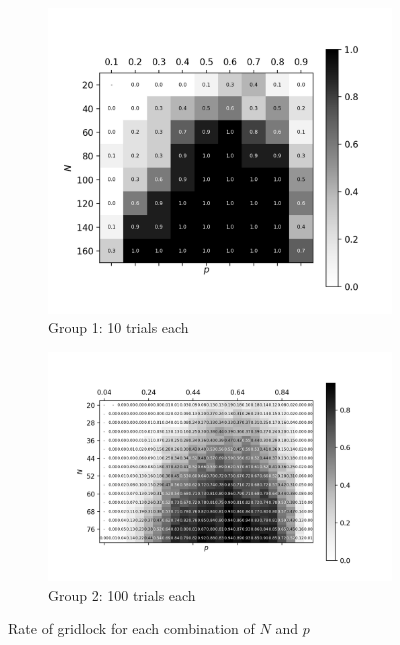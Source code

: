 \begin{figure}
\centering
\begin{subfigure}[c]{0.48\textwidth}
\centering
\includegraphics[height=0.225\textheight]{fig/gridlock_big}
\caption{Group 1: 10 trials each}
\end{subfigure}
\quad
\begin{subfigure}[c]{0.48\textwidth}
\centering
\includegraphics[height=0.225\textheight]{fig/gridlock_small}
\caption{Group 2: 100 trials each}
\end{subfigure}
\caption{Rate of gridlock for each combination of $N$ and $p$}
\label{fig:gridlock}
\end{figure}

